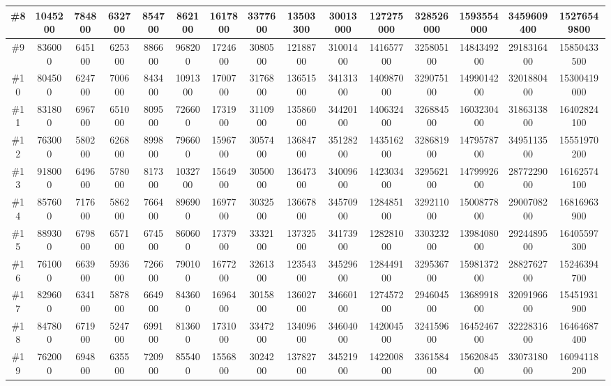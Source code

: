 \documentclass[titlepage]{article}
\begin{document}
\begin{landscape}
\begin{table}[h]
\begin{tabular}{|c|c|c|c|c|c|c|c|c|c|c|c|c|c|c|}
			\hline
			\#8      & 1045200 & 784800  & 632700 & 854700  & 862100  & 1617800 & 3377600 & 13503300 & 30013000 & 127275000 & 328526000 & 1593554000 & 3459609400 & 15276549800  \\ 
			\hline
			\#9      & 836000  & 645100  & 625300 & 886600  & 968200  & 1724600 & 3080500 & 12188700 & 31001400 & 141657700 & 325805100 & 1484349200 & 2918316400 & 15850433500  \\ 
			\hline
			\#10     & 804500  & 624700  & 700600 & 843400  & 1091300 & 1700700 & 3176800 & 13651500 & 34131300 & 140987000 & 329075100 & 1499014200 & 3201880400 & 15300419000  \\ 
			\hline
			\#11     & 831800  & 696700  & 651000 & 809500  & 726600  & 1731900 & 3110900 & 13586000 & 34420100 & 140632400 & 326884500 & 1603230400 & 3186313800 & 16402824100  \\ 
			\hline
			\#12     & 763000  & 580200  & 626800 & 899800  & 796600  & 1596700 & 3057400 & 13684700 & 35128200 & 143516200 & 328681900 & 1479578700 & 3495113500 & 15551970200  \\ 
			\hline
			\#13     & 918000  & 649600  & 578000 & 817300  & 1032700 & 1564900 & 3050000 & 13647300 & 34009600 & 142303400 & 329562100 & 1479992600 & 2877229000 & 16162574100  \\ 
			\hline
			\#14     & 857600  & 717600  & 586200 & 766400  & 896900  & 1697700 & 3032500 & 13667800 & 34570900 & 128485100 & 329211000 & 1500877800 & 2900708200 & 16816963900  \\ 
			\hline
			\#15     & 889300  & 679800  & 657100 & 674500  & 860600  & 1737900 & 3332100 & 13732500 & 34173900 & 128281000 & 330323200 & 1398408000 & 2924489500 & 16405597300  \\ 
			\hline
			\#16     & 761000  & 663900  & 593600 & 726600  & 790100  & 1677200 & 3261300 & 12354300 & 34529600 & 128449100 & 329536700 & 1598137200 & 2882762700 & 15246394700  \\ 
			\hline
			\#17     & 829600  & 634100  & 587800 & 664900  & 843600  & 1696400 & 3015800 & 13602700 & 34660100 & 127457200 & 294604500 & 1368991800 & 3209196600 & 15451931900  \\ 
			\hline
			\#18     & 847800  & 671900  & 524700 & 699100  & 813600  & 1731000 & 3347200 & 13409600 & 34604000 & 142004500 & 324159600 & 1645246700 & 3222831600 & 16464687400  \\ 
			\hline
			\#19     & 762000  & 694800  & 635500 & 720900  & 855400  & 1556800 & 3024200 & 13782700 & 34521900 & 142200800 & 336158400 & 1562084500 & 3307318000 & 16094118200  \\ 

\end{tabular}
\end{table}
\end{landscape}
\end{document}
